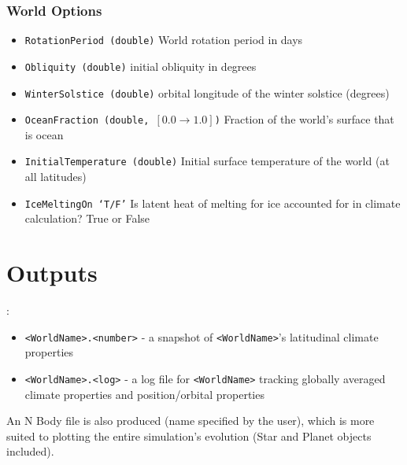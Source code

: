 \documentclass[usenatbib,11pt]{article}
\begin{document}
\subsubsection{World Options}

\begin{itemize}
\item{\texttt{RotationPeriod (double)}} World rotation period in days
\item{\texttt{Obliquity (double)}} initial obliquity in degrees
\item{\texttt{WinterSolstice (double)}} orbital longitude of the winter solstice (degrees)
\item{\texttt{OceanFraction (double, $[0.0 \rightarrow 1.0]$)}} Fraction of the world's surface that is ocean
\item{\texttt{InitialTemperature (double)}} Initial surface temperature of the world (at all latitudes)
\item{\texttt{IceMeltingOn `T/F'}} Is latent heat of melting for ice accounted for in climate calculation? True or False 
\end{itemize}

\section{Outputs}:

\begin{itemize}
\item{\texttt{<WorldName>.<number>}} - a  snapshot of \texttt{<WorldName>}'s latitudinal climate properties
\item{\texttt{<WorldName>.<log>}} - a log file for \texttt{<WorldName>} tracking globally averaged climate properties and position/orbital properties
\end{itemize}


An N Body file is also produced (name specified by the user), which is more suited to plotting the entire simulation's evolution (Star and Planet objects included).

%
%
\end{document}
